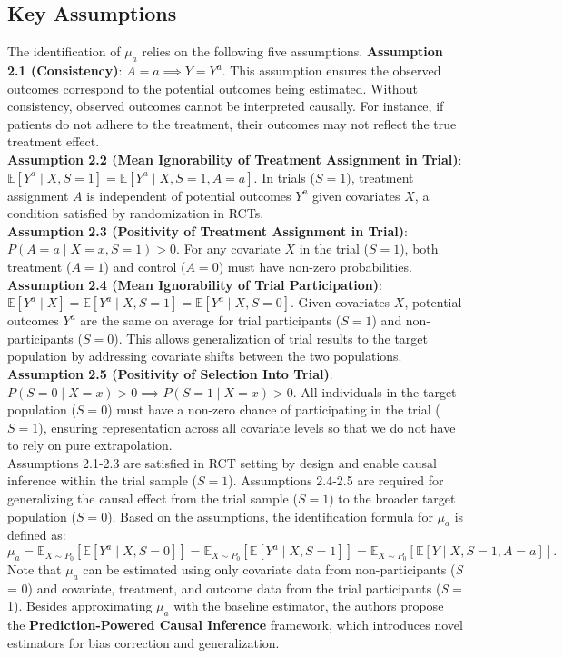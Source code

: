 \documentclass[12pt, oneside]{amsart}
\theoremstyle{definition}
\theoremstyle{remark}
\numberwithin{equation}{section}
\begin{document}
\subsection{Key Assumptions}
The identification of $\mu_a$ relies on the following five assumptions.
\textbf{Assumption 2.1 (Consistency)}: 
$A = a \implies Y = Y^a.
$
This assumption ensures the observed outcomes correspond to the potential outcomes being estimated. Without consistency, observed outcomes cannot be interpreted causally. For instance, if patients do not adhere to the treatment, their outcomes may not reflect the true treatment effect.\\

\textbf{Assumption 2.2 (Mean Ignorability of Treatment Assignment in Trial)}: 
$
\mathbb{E}[Y^a \mid X, S = 1] = \mathbb{E}[Y^a \mid X, S = 1, A = a].
$
In trials ($S = 1$), treatment assignment $A$ is independent of potential outcomes $Y^a$ given covariates $X$, a condition satisfied by randomization in RCTs.\\

\textbf{Assumption 2.3 (Positivity of Treatment Assignment in Trial)}:
$
P(A = a \mid X = x, S = 1) > 0.
$
For any covariate $X$ in the trial ($S = 1$), both treatment ($A = 1$) and control ($A = 0$) must have non-zero probabilities.\\

\textbf{Assumption 2.4 (Mean Ignorability of Trial Participation)}: 
$
\mathbb{E}[Y^a \mid X] = \mathbb{E}[Y^a \mid X, S = 1] = \mathbb{E}[Y^a \mid X, S = 0].
$
Given covariates $X$, potential outcomes $Y^a$ are the same on average for trial participants ($S = 1$) and non-participants ($S = 0$). This allows generalization of trial results to the target population by addressing covariate shifts between the two populations.\\

\textbf{Assumption 2.5 (Positivity of Selection Into Trial)}:
$
P(S = 0 \mid X = x) > 0 \implies P(S = 1 \mid X = x) > 0.
$
All individuals in the target population ($S = 0$) must have a non-zero chance of participating in the trial ($S = 1$), ensuring representation across all covariate levels so that we do not have to rely on pure extrapolation. \\


 Assumptions 2.1-2.3 are satisfied in RCT setting by design and enable causal inference within the trial sample ($S = 1$). Assumptions 2.4-2.5 are required for generalizing the causal effect from the trial sample ($S = 1$) to the broader target population ($S = 0$). Based on the assumptions, the identification formula for $\mu_a$ is defined as:
$$
\mu_a = \mathbb{E}_{X \sim P_0} [\mathbb{E}[Y^a \mid X, S = 0]]
= \mathbb{E}_{X \sim P_0} [\mathbb{E}[Y^a \mid X, S = 1]]
= \mathbb{E}_{X \sim P_0} [\mathbb{E}[Y \mid X, S = 1, A = a]].
$$
Note that $ \mu_a$ can be estimated using only covariate data from non-participants (\textit{S }= 0) and covariate, treatment, and outcome data from the trial participants (\textit{S }= 1). Besides approximating $\mu_a$ with the baseline estimator, the authors propose the \textbf{Prediction-Powered Causal Inference} framework, which introduces novel estimators for bias correction and generalization. 
\end{document}
